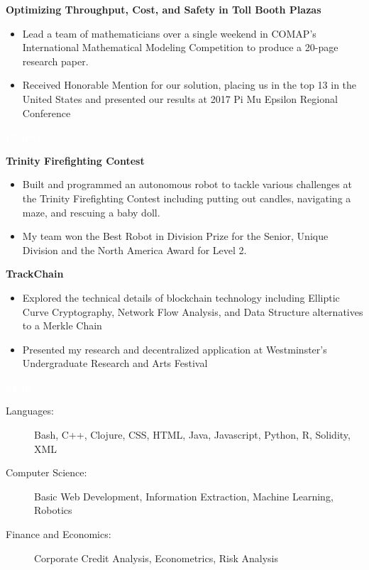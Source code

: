 \documentclass[letterpaper,11pt]{article}
\newcommand{\resitem}[1]{\item #1 \vspace{-2pt}}
\newcommand{\resheading}[1]{{\large \colorbox{mypurple}{\begin{minipage}{\textwidth}{\textbf{#1 \vphantom{p\^{E}}}}\end{minipage}}}}
\begin{document}
		\textbf{Optimizing Throughput, Cost, and Safety in Toll Booth Plazas}
		\begin{itemize}
			\resitem{Lead a team of mathematicians over a single weekend in COMAP's International Mathematical Modeling Competition to produce a 20-page research paper.}
			\resitem{Received Honorable Mention for our solution, placing us in the top 13 in the United States and presented our results at 2017 Pi Mu Epsilon Regional Conference}
		\end{itemize}
	
	\resheading{\textcolor{white}{Projects}}
	
			\vspace{0.1in}
	
	\textbf{Trinity Firefighting Contest}
	\begin{itemize}
		\resitem{Built and programmed an autonomous robot to tackle various challenges at the Trinity Firefighting Contest including putting out candles, navigating a maze, and rescuing a baby doll.}
		\resitem{My team won the Best Robot in Division Prize for the Senior, Unique Division and the North America Award for Level 2.}
	\end{itemize}

	\textbf{TrackChain}
	\begin{itemize}
		\resitem{Explored the technical details of blockchain technology including Elliptic Curve Cryptography, Network Flow Analysis, and Data Structure alternatives to a Merkle Chain}
		\resitem{Presented my research and decentralized application at Westminster’s Undergraduate Research and Arts Festival}
	\end{itemize}
	
	\resheading{\textcolor{white}{Skills}}
	
	\begin{description}
		\item[Languages:] Bash, C++, Clojure, CSS, HTML, Java, Javascript, Python, R, Solidity, XML
		\item[Computer Science:] Basic Web Development, Information Extraction, Machine Learning, Robotics
		\item[Finance and Economics:] Corporate Credit Analysis, Econometrics, Risk Analysis
	\end{description}
	
\end{document}
